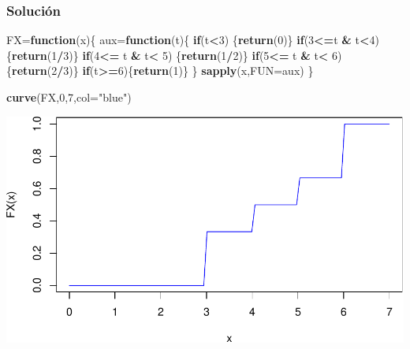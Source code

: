 \documentclass[
]{article}
\newenvironment{Shaded}{\begin{snugshade}}{\end{snugshade}}
\newcommand{\ControlFlowTok}[1]{\textcolor[rgb]{0.13,0.29,0.53}{\textbf{#1}}}
\newcommand{\DataTypeTok}[1]{\textcolor[rgb]{0.13,0.29,0.53}{#1}}
\newcommand{\DecValTok}[1]{\textcolor[rgb]{0.00,0.00,0.81}{#1}}
\newcommand{\KeywordTok}[1]{\textcolor[rgb]{0.13,0.29,0.53}{\textbf{#1}}}
\newcommand{\NormalTok}[1]{#1}
\newcommand{\OperatorTok}[1]{\textcolor[rgb]{0.81,0.36,0.00}{\textbf{#1}}}
\newcommand{\StringTok}[1]{\textcolor[rgb]{0.31,0.60,0.02}{#1}}
\begin{document}
\hypertarget{soluciuxf3n-1}{%
\subsubsection{Solución}\label{soluciuxf3n-1}}

\begin{Shaded}
\begin{Highlighting}[]
\NormalTok{FX=}\ControlFlowTok{function}\NormalTok{(x)\{}
\NormalTok{  aux=}\ControlFlowTok{function}\NormalTok{(t)\{}
    \ControlFlowTok{if}\NormalTok{(t}\OperatorTok{\textless{}}\DecValTok{3}\NormalTok{) \{}\KeywordTok{return}\NormalTok{(}\DecValTok{0}\NormalTok{)\}}
    \ControlFlowTok{if}\NormalTok{(}\DecValTok{3}\OperatorTok{\textless{}=}\NormalTok{t }\OperatorTok{\&}\StringTok{ }\NormalTok{t}\OperatorTok{\textless{}}\DecValTok{4}\NormalTok{) \{}\KeywordTok{return}\NormalTok{(}\DecValTok{1}\OperatorTok{/}\DecValTok{3}\NormalTok{)\}}
    \ControlFlowTok{if}\NormalTok{(}\DecValTok{4}\OperatorTok{\textless{}=}\StringTok{ }\NormalTok{t }\OperatorTok{\&}\StringTok{ }\NormalTok{t}\OperatorTok{\textless{}}\StringTok{ }\DecValTok{5}\NormalTok{) \{}\KeywordTok{return}\NormalTok{(}\DecValTok{1}\OperatorTok{/}\DecValTok{2}\NormalTok{)\}}
    \ControlFlowTok{if}\NormalTok{(}\DecValTok{5}\OperatorTok{\textless{}=}\StringTok{ }\NormalTok{t }\OperatorTok{\&}\StringTok{ }\NormalTok{t}\OperatorTok{\textless{}}\StringTok{ }\DecValTok{6}\NormalTok{) \{}\KeywordTok{return}\NormalTok{(}\DecValTok{2}\OperatorTok{/}\DecValTok{3}\NormalTok{)\}}
    \ControlFlowTok{if}\NormalTok{(t}\OperatorTok{\textgreater{}=}\DecValTok{6}\NormalTok{)\{}\KeywordTok{return}\NormalTok{(}\DecValTok{1}\NormalTok{)\}}
\NormalTok{    \}}
  \KeywordTok{sapply}\NormalTok{(x,}\DataTypeTok{FUN=}\NormalTok{aux)}
\NormalTok{\}}

\KeywordTok{curve}\NormalTok{(FX,}\DecValTok{0}\NormalTok{,}\DecValTok{7}\NormalTok{,}\DataTypeTok{col=}\StringTok{"blue"}\NormalTok{)}
\end{Highlighting}
\end{Shaded}

\includegraphics{Tema-2---Variables-Aleatorias_Soluciones_files/figure-latex/unnamed-chunk-2-1.pdf}
\end{document}
